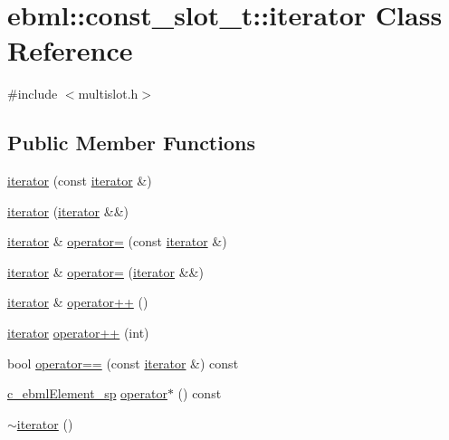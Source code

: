 \hypertarget{classebml_1_1const__slot__t_1_1iterator}{}\section{ebml\+:\+:const\+\_\+slot\+\_\+t\+:\+:iterator Class Reference}
\label{classebml_1_1const__slot__t_1_1iterator}


{\ttfamily \#include $<$multislot.\+h$>$}

\subsection*{Public Member Functions}
\begin{DoxyCompactItemize}
\item 
\mbox{\hyperlink{classebml_1_1const__slot__t_1_1iterator_ab5c607a79ab82a12004a36ee5d9a24de}{iterator}} (const \mbox{\hyperlink{classebml_1_1const__slot__t_1_1iterator}{iterator}} \&)
\item 
\mbox{\hyperlink{classebml_1_1const__slot__t_1_1iterator_a8258c12e1135229426a809866cd1c8f1}{iterator}} (\mbox{\hyperlink{classebml_1_1const__slot__t_1_1iterator}{iterator}} \&\&)
\item 
\mbox{\hyperlink{classebml_1_1const__slot__t_1_1iterator}{iterator}} \& \mbox{\hyperlink{classebml_1_1const__slot__t_1_1iterator_a5c740887da46e7c54f9fd8a9655117b9}{operator=}} (const \mbox{\hyperlink{classebml_1_1const__slot__t_1_1iterator}{iterator}} \&)
\item 
\mbox{\hyperlink{classebml_1_1const__slot__t_1_1iterator}{iterator}} \& \mbox{\hyperlink{classebml_1_1const__slot__t_1_1iterator_a251b75281da861c02baa703255a6c52b}{operator=}} (\mbox{\hyperlink{classebml_1_1const__slot__t_1_1iterator}{iterator}} \&\&)
\item 
\mbox{\hyperlink{classebml_1_1const__slot__t_1_1iterator}{iterator}} \& \mbox{\hyperlink{classebml_1_1const__slot__t_1_1iterator_a419b15517b3cc8d258e663ec05c3a184}{operator++}} ()
\item 
\mbox{\hyperlink{classebml_1_1const__slot__t_1_1iterator}{iterator}} \mbox{\hyperlink{classebml_1_1const__slot__t_1_1iterator_ac36eaf1d2acbd2306ff81558a21b9e5a}{operator++}} (int)
\item 
bool \mbox{\hyperlink{classebml_1_1const__slot__t_1_1iterator_a9e1be97f1f8fd009c30da16a708ecc28}{operator==}} (const \mbox{\hyperlink{classebml_1_1const__slot__t_1_1iterator}{iterator}} \&) const
\item 
\mbox{\hyperlink{namespaceebml_a2deef4e8071531b32e3533f1bf978917}{c\+\_\+ebml\+Element\+\_\+sp}} \mbox{\hyperlink{classebml_1_1const__slot__t_1_1iterator_a5c58aa9b8ada3a3fdfbf4cba45b05a2f}{operator$\ast$}} () const
\item 
\mbox{\hyperlink{classebml_1_1const__slot__t_1_1iterator_a2395dc6161db7b275ea770ccc00f4637}{$\sim$iterator}} ()
\end{DoxyCompactItemize}
